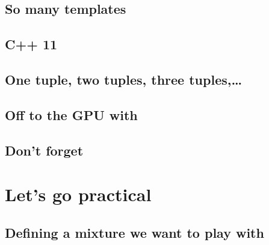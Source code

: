 \documentclass{documentation}
\begin{document}
\section{So many templates}

\section{C++ 11}

\section{One tuple, two tuples, three tuples,\dots}

\section{\EIGEN}

\section{\Boost}

\section{\MetaPhysicL}

\section{Off to the GPU with \VexCL}

\section{\ViennaCL}

\section{\GRVY}

\section{Don't forget \Doxygen}
\label{dox}


\chapter{Let's go practical}
\chaptermark{\ANTIOCHPrac}
\label{Antioch:practice}

\section{Defining a mixture we want to play with}
\end{document}
